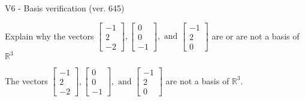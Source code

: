 \begin{exercise}
  \begin{exerciseTitle}V6 - Basis verification (ver. 645)\end{exerciseTitle}
  \begin{exerciseStatement}
    Explain why the vectors \(\left[\begin{array}{r}
-1 \\
2 \\
-2
\end{array}\right] , \left[\begin{array}{r}
0 \\
0 \\
-1
\end{array}\right] , \text{ and } \left[\begin{array}{r}
-1 \\
2 \\
0
\end{array}\right]\) are or are not a basis of \(\mathbb{R}^3\)	


  \end{exerciseStatement}
  \begin{exerciseAnswer}
   The vectors \(\left[\begin{array}{r}
-1 \\
2 \\
-2
\end{array}\right] , \left[\begin{array}{r}
0 \\
0 \\
-1
\end{array}\right] , \text{ and } \left[\begin{array}{r}
-1 \\
2 \\
0
\end{array}\right]\) 
  	 are not  a basis of \(\mathbb{R}^3\).
  


  \end{exerciseAnswer}
\end{exercise}